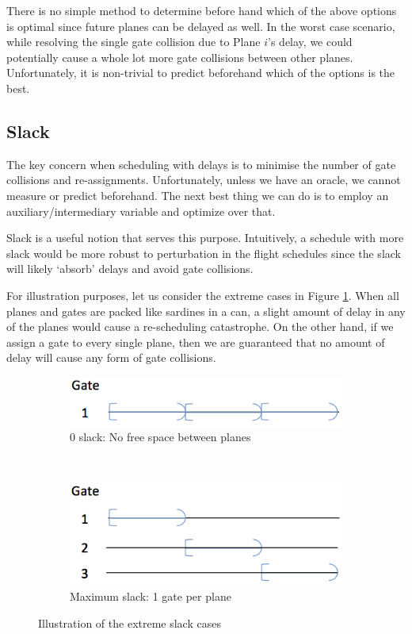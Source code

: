 \documentclass[12pt, a4paper]{report}
\begin{document}
There is no simple method to determine before hand which of the above options is optimal since future planes can be delayed as well. In the worst case scenario, while resolving the single gate collision due to Plane $i$'s delay, we could potentially cause a whole lot more gate collisions between other planes. Unfortunately, it is non-trivial to predict beforehand which of the options is the best.

\label{Subsection: Slack}
\subsection{Slack}
The key concern when scheduling with delays is to minimise the number of gate collisions and re-assignments. Unfortunately, unless we have an oracle, we cannot measure or predict beforehand. The next best thing we can do is to employ an auxiliary/intermediary variable and optimize over that.

Slack is a useful notion that serves this purpose. Intuitively, a schedule with more slack would be more robust to perturbation in the flight schedules since the slack will likely `absorb' delays and avoid gate collisions.

For illustration purposes, let us consider the extreme cases in Figure \ref{fig:Extreme}. When all planes and gates are packed like sardines in a can, a slight amount of delay in any of the planes would cause a re-scheduling catastrophe. On the other hand, if we assign a gate to every single plane, then we are guaranteed that no amount of delay will cause any form of gate collisions.

\begin{figure}[h!]
\centering
\begin{subfigure}[b]{0.5\textwidth}
	\centering
	\includegraphics[width=\textwidth]{../figures/extreme0.png}
	\caption{0 slack: No free space between planes}
\end{subfigure}~
\begin{subfigure}[b]{0.5\textwidth}
	\centering
	\includegraphics[width=\textwidth]{../figures/extreme_max.png}
	\caption{Maximum slack: 1 gate per plane}
\end{subfigure}
\caption{Illustration of the extreme slack cases}
\label{fig:Extreme}
\end{figure}
\end{document}
